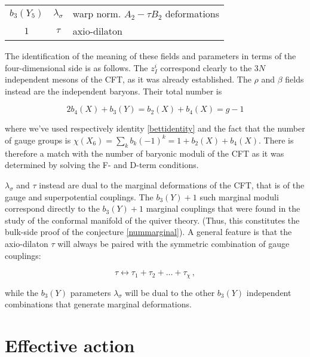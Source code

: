 \begin{center}
\begin{tabular}{|c | c | l |}
	\hline
	$b_3(Y_5)$ 	& $\lambda_\sigma$	& warp norm. $A_2 - \tau B_2$ deformations\\
	$1$		& $\tau$		& axio-dilaton\\
	\hline
\end{tabular}
\end{center}

The identification of the meaning of these fields and parameters in terms of the four-dimensional side is as follows. The $z_I^i$ correspond clearly to the $3N$ independent mesons of the CFT, as it was already established. The $\rho$ and $\beta$ fields instead are the independent baryons. Their total number is

\begin{equation}
	2 b_4(X) + b_3(Y) = b_2(X) + b_4(X) = g - 1
	\label{}
\end{equation}

where we've used respectively identity \ref{bettidentity} and the fact that the number of gauge groups is $\chi(X_6) = \sum_k b_k (-1)^k = 1 + b_2(X) + b_4(X) $. There is therefore a match with the number of baryonic moduli of the CFT as it was determined by solving the F- and D-term conditions.

$\lambda_\sigma$ and $\tau$ instead are dual to the marginal deformations of the CFT, that is of the gauge and superpotential couplings. The $b_3(Y) + 1$ such marginal moduli correspond directly to the $b_3(Y) + 1$ marginal couplings that were found in the study of the conformal manifold of the quiver theory. (Thus, this constitutes the bulk-side proof of the conjecture \eqref{nummarginal}). A general feature is that the axio-dilaton $\tau$ will always be paired with the symmetric combination of gauge couplings:

\begin{equation}
	\tau \leftrightarrow \tau_1 + \tau_2 + \ldots + \tau_\chi\,,
	\label{}
\end{equation}

while the $b_3(Y)$ parameters $\lambda_\sigma$ will be dual to the other $b_3(Y)$ independent combinations that generate marginal deformations.

\section{Effective action}\label{sec:heftlagrangian}

